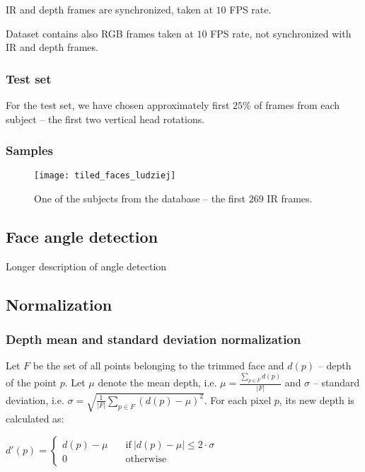     IR and depth frames are synchronized, taken at $10$ FPS rate.

    Dataset contains also RGB frames taken at $10$ FPS rate, not synchronized
    with IR and depth frames.

    \subsubsection*{Test set}
    For the test set, we have chosen approximately first $25\%$ of
    frames from each subject -- the first two vertical head rotations.

    \subsubsection*{Samples}
    \begin{figure}[H]
    \caption{One of the subjects from the database -- the first $269$ IR frames.}
    \centering
    \texttt{[image: tiled\_faces\_ludziej]}
    \end{figure}

    \subsection{Face angle detection}
    \label{sec:angledetection}
    Longer description of angle detection

    \subsection{Normalization}
        \subsubsection*{Depth mean and standard deviation normalization}
        Let $F$ be the set of all points belonging to the trimmed face and
        $d(p)$ -- depth of the point $p$. Let $\mu$ denote the mean depth, i.e.
        $\mu = \frac{\sum\limits_{p \in F}{d(p)}}{|F|}$ and $\sigma$ -- standard
        deviation, i.e. $\sigma = \sqrt{\frac{1}{|F|} \sum\limits_{p \in F}{(d(p) - \mu)^2}}$.
        For each pixel $p$, its new depth is calculated as:

        \begin{center}
        $
          d'(p) = \begin{cases}
                  d(p) - \mu &\quad\text{if}\ |d(p) - \mu| \leqslant 2 \cdot \sigma \\
                  0 &\quad\text{otherwise}
                  \end{cases}
        $
        \end{center}


